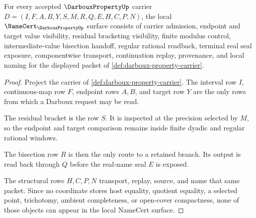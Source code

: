 \begin{theorem}
\label{thm:darboux-property-namecert-obligations}
For every accepted $\DarbouxPropertyUp$ carrier $D=(I,F,A,B,Y,S,M,R,Q,E,H,C,P,N)$, the local $\NameCert_{\DarbouxPropertyUp}$ surface consists of carrier admission, endpoint and target value visibility, residual bracketing visibility, finite modulus control, intermediate-value bisection handoff, regular rational readback, terminal real seal exposure, componentwise transport, continuation replay, provenance, and local naming for the displayed packet of \autoref{def:darboux-property-carrier}.
\end{theorem}
\begin{proof}
Project the carrier of \autoref{def:darboux-property-carrier}. The interval row $I$, continuous-map row $F$, endpoint rows $A,B$, and target row $Y$ are the only rows from which a Darboux request may be read.

The residual bracket is the row $S$. It is inspected at the precision selected by $M$, so the endpoint and target comparison remains inside finite dyadic and regular rational windows.

The bisection row $R$ is then the only route to a retained branch. Its output is read back through $Q$ before the real-name seal $E$ is exposed.

The structural rows $H,C,P,N$ transport, replay, source, and name that same packet. Since no coordinate stores host equality, quotient equality, a selected point, trichotomy, ambient completeness, or open-cover compactness, none of those objects can appear in the local NameCert surface.
\end{proof}

